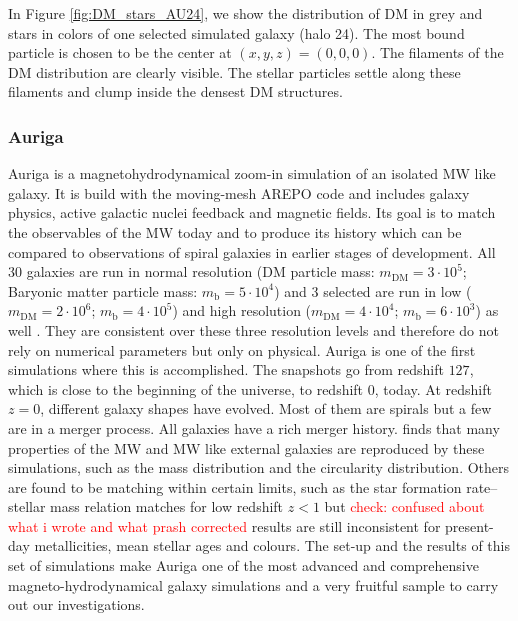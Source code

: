 In Figure \ref{fig:DM_stars_AU24}, we show the distribution of \ac{DM} in grey and stars in colors of one selected simulated galaxy (halo 24). The most bound particle is chosen to be the center at $(x,y,z) = (0,0,0)$. The filaments of the \ac{DM} distribution are clearly visible. The stellar particles settle along these filaments and clump inside the densest \ac{DM} structures. 

\subsubsection{Auriga}\label{subsubsec:auriga_intro}
Auriga is a magnetohydrodynamical zoom-in simulation of an isolated \ac{MW} like galaxy. It is build with the moving-mesh AREPO \citep{AREPO} code and includes galaxy physics, active galactic nuclei feedback and magnetic fields. Its goal is to match the observables of the \ac{MW} today and to produce its history which can be compared to observations of spiral galaxies in earlier stages of development. All 30 galaxies are run in normal resolution (\ac{DM} particle mass: $m_\mathrm{DM} = 3\cdot10^5$; Baryonic matter particle mass: $m_\mathrm{b} = 5\cdot10^4$) and 3 selected are run in low ($m_\mathrm{DM} = 2\cdot10^6$; $m_\mathrm{b} = 4\cdot10^5$) and high resolution ($m_\mathrm{DM} = 4\cdot10^4$; $m_\mathrm{b} = 6\cdot10^3$) as well \citep{AurigaGrand}. They are consistent over these three resolution levels and therefore do not rely on numerical parameters but only on physical. Auriga is one of the first simulations where this is accomplished. The snapshots go from redshift $127$, which is close to the beginning of the universe, to redshift $0$, today.  At redshift $z= 0$, different galaxy shapes have evolved. Most of them are spirals but a few are in a merger process. All galaxies have a rich merger history. \citet{AurigaGrand} finds that many properties of the \ac{MW} and \ac{MW} like external galaxies are reproduced by these simulations, such as the mass distribution and the circularity distribution. Others are found to be matching within certain limits, such as the star formation rate–stellar mass relation matches for low redshift $z<1$ but \textcolor{red}{check: confused about what i wrote and what prash corrected} results are still inconsistent for present-day metallicities, mean stellar ages and colours. The set-up and the results of this set of simulations make Auriga one of the most advanced and comprehensive magneto-hydrodynamical galaxy simulations and a very fruitful sample to carry out our investigations. \\
